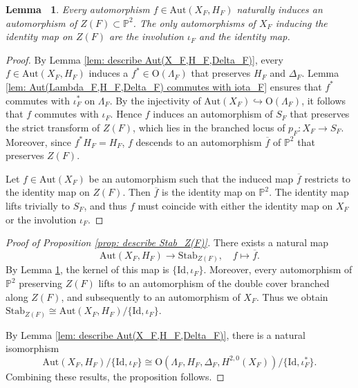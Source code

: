 \documentclass[12pt,reqno,a4paper]{amsart}
\newtheorem{lem}[thm]{Lemma~}
\theoremstyle{remark}
\theoremstyle{definition}
\begin{document}
\begin{lem}
\label{lem: Aut(X_F,H_F) to Stab_Z(F)}
    Every automorphism $f\in \mathrm{Aut}(X_F,H_F)$ naturally induces an automorphism of $Z(F)\subset\mathbb{P}^2$.
    The only automorphisms of $X_F$ inducing the identity map on $Z(F)$ are the involution $\iota_F$ and the identity map.
\end{lem}
\begin{proof}
    By Lemma \ref{lem: describe Aut(X_F,H_F,Delta_F)}, every $f\in \mathrm{Aut}(X_F,H_F)$ induces a $f^*\in\mathrm{O}(\Lambda_F)$ that preserves $H_F$ and $\Delta_F$. 
                        Lemma \ref{lem: Aut(Lambda_F,H_F,Delta_F) commutes with iota_F} ensures that $f^*$ commutes with $\iota_F^*$ on $\Lambda_F$.     By the injectivity of $\mathrm{Aut}(X_F)\hookrightarrow\mathrm{O}(\Lambda_F)$, it follows that $f$ commutes with $\iota_F$.
    Hence $f$ induces an automorphism of $S_F$ that preserves the strict transform of $Z(F)$, which lies in the branched locus of $p_F\colon X_F\to S_F$.
        Moreover, since $f^*H_F=H_F$, $f$ descends to an automorphism $\overline{f}$ of $\mathbb{P}^2$ that preserves $Z(F)$.

    Let $f\in\mathrm{Aut}(X_F)$ be an automorphism such that the induced map $\overline{f}$ restricts to the identity map on $Z(F)$.
    Then $\overline{f}$ is the identity map on $\mathbb{P}^2$.
    The identity map lifts trivially to $S_F$, and thus $f$ must coincide with either the identity map on $X_F$ or the involution $\iota_F$.
\end{proof}
\begin{proof}[Proof of Proposition \ref{prop: describe Stab_Z(F)}]
    There exists a natural map 
    \begin{equation*}
        \mathrm{Aut}(X_F,H_F) \to \mathrm{Stab}_{Z(F)}, \quad f\mapsto\overline{f}.
    \end{equation*} 
    By Lemma \ref{lem: Aut(X_F,H_F) to Stab_Z(F)}, the kernel of this map is $\{\mathrm{Id},\iota_F\}$. Moreover, every automorphism of $\mathbb{P}^2$ preserving $Z(F)$ lifts to an automorphism of the double cover branched along $Z(F)$, and subsequently to an automorphism of $X_F$. Thus we obtain $\mathrm{Stab}_{Z(F)} \cong \mathrm{Aut}(X_F,H_F)/\{\mathrm{Id},\iota_F\}$.

    By Lemma \ref{lem: describe Aut(X_F,H_F,Delta_F)}, there is a natural isomorphism
    \begin{equation*}
        \mathrm{Aut}(X_F,H_F)/\{\mathrm{Id},\iota_F\} \cong \mathrm{O}(\Lambda_F,H_F,\Delta_F,H^{2,0}(X_F))/\{\mathrm{Id},\iota_F^*\}.
    \end{equation*}
    Combining these results, the proposition follows.
\end{proof}
\end{document}
